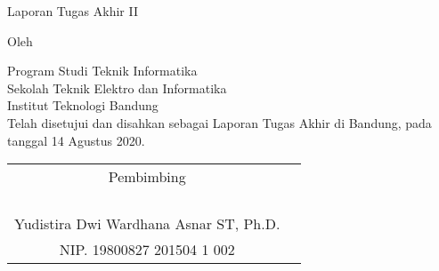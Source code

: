 \clearpage
\pagestyle{empty}

\begin{center}
    \smallskip

    \Large \bfseries \MakeUppercase{\thetitle}
    \vfill

    \Large Laporan Tugas Akhir II
    \vfill

    \large Oleh

    \Large \theauthor

    \large Program Studi Teknik Informatika \\
    Sekolah Teknik Elektro dan Informatika \\
    Institut Teknologi Bandung \\

    \vfill
    \normalsize \normalfont
    Telah disetujui dan disahkan sebagai Laporan Tugas Akhir di Bandung, pada tanggal 14 Agustus 2020.

    \vfill
    \setlength{\tabcolsep}{12pt}
    \begin{tabular}{c@{\hskip 0in}c}
        Pembimbing                             \\
         &                                     \\
         &                                     \\
         &                                     \\
         &                                     \\
        Yudistira Dwi Wardhana Asnar ST, Ph.D. \\
        NIP. 19800827 201504 1 002             \\
    \end{tabular}

\end{center}
\clearpage
